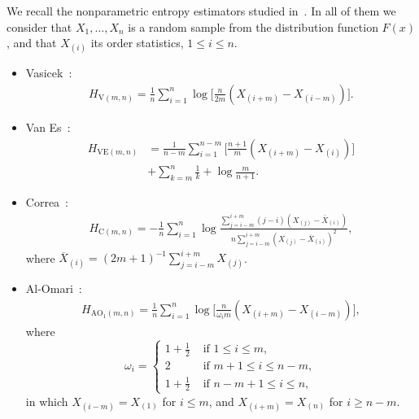 \documentclass[journal]{IEEEtran}
\begin{document}
	We recall the nonparametric entropy estimators studied in~\cite{AlOmari2016}. 
	In all of them we consider that $X_1,\ldots,X_n$ is a random sample from the distribution function $F(x)$, and that $X_{(i)}$ its order statistics, $1\leq i\leq n$. 
	\begin{itemize}
		\item Vasicek~\cite{Vasicek76}:
		\begin{align}
			\label{HV}
			H_{\text{V}(m,n)}=\frac{1}{n} \sum_{i=1}^{n} \log \Big[\frac{n}{2 m}\left(X_{(i+m)}-X_{(i-m)}\right)\Big].
		\end{align}
		\item Van Es~\cite{VanEs92}:
		\begin{align}
			\label{HVE}
			H_{\text{VE}(m,n)}&=\frac{1}{n-m} \sum_{i=1}^{n-m}\Big[\frac{n+1}{m}\left(X_{(i+m)}-X_{(i)}\right)\Big] \nonumber\\
			&+\sum_{k=m}^{n} \frac{1}{k}+\log \frac{m}{n+1}.
		\end{align}
		\item Correa~\cite{Correa95}:
		\begin{align}
			\label{HC}
			H_{\text{C}(m,n)}=-\frac{1}{n} \sum_{i=1}^{n} \log \frac{\sum_{j=i-m}^{i+m}(j-i)\left(X_{(j)}-\overline{X}_{(i)}\right)}{n \sum_{j=i-m}^{i+m}\left(X_{(j)}-\overline{X}_{(i)}\right)^{2}},
		\end{align}
		where $\overline{X}_{(i)}=(2 m+1)^{-1} \sum_{j=i-m}^{i+m} X_{(j)}$.
		\item Al-Omari~\cite{AlOmari2014}:
		\begin{align}
			H_{\text{AO}_1(m,n)}=\frac{1}{n} \sum_{i=1}^{n} \log \Big[\frac{n}{\omega_{i} m}\left(X_{(i+m)}-X_{(i-m)}\right)\Big], 
			\label{AHE}
		\end{align}
		where
		\begin{equation*}
			\omega_{i}= \begin{cases}
				1+\frac{1}{2} & \text{ if }1 \leq i \leq m, \\
				2 & \text{ if } m+1 \leq i \leq n-m, \\
				1+\frac{1}{2} & \text{ if } n-m+1 \leq i \leq n,
			\end{cases}
		\end{equation*}
		in which $X_{(i-m)}=X_{(1)}$ for $i \leq m$, and $X_{(i+m)}=X_{(n)}$ for $i \geq n-m$.

\end{itemize}
\end{document}
